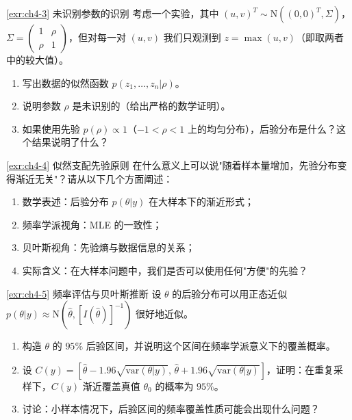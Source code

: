 \begin{Exercise}{\ref{exr:ch4-3}  未识别参数的识别}
考虑一个实验，其中 $(u, v)^T \sim \mathrm{N}((0,0)^T, \Sigma)$，$\Sigma = \begin{pmatrix} 1 & \rho \\ \rho & 1 \end{pmatrix}$，但对每一对 $(u,v)$ 我们只观测到 $z = \max(u,v)$（即取两者中的较大值）。
\begin{enumerate}
  \item 写出数据的似然函数 $p(z_1,\ldots,z_n|\rho)$。
  \item 说明参数 $\rho$ 是未识别的（给出严格的数学证明）。
  \item 如果使用先验 $p(\rho) \propto 1$（$-1<\rho<1$ 上的均匀分布），后验分布是什么？这个结果说明了什么？
\end{enumerate}
\end{Exercise}

\begin{Exercise}{\ref{exr:ch4-4}  似然支配先验原则}
在什么意义上可以说"随着样本量增加，先验分布变得渐近无关"？请从以下几个方面阐述：
\begin{enumerate}
  \item 数学表述：后验分布 $p(\theta|y)$ 在大样本下的渐近形式；
  \item 频率学派视角：MLE 的一致性；
  \item 贝叶斯视角：先验熵与数据信息的关系；
  \item 实际含义：在大样本问题中，我们是否可以使用任何"方便"的先验？
\end{enumerate}
\end{Exercise}

\begin{Exercise}{\ref{exr:ch4-5}  频率评估与贝叶斯推断}
设 $\theta$ 的后验分布可以用正态近似 $p(\theta|y) \approx \mathrm{N}(\hat{\theta}, [I(\hat{\theta})]^{-1})$ 很好地近似。
\begin{enumerate}
  \item 构造 $\theta$ 的 $95\%$ 后验区间，并说明这个区间在频率学派意义下的覆盖概率。
  \item 设 $C(y) = [\hat{\theta} - 1.96\sqrt{\text{var}(\theta|y)},\, \hat{\theta} + 1.96\sqrt{\text{var}(\theta|y)}]$，证明：在重复采样下，$C(y)$ 渐近覆盖真值 $\theta_0$ 的概率为 $95\%$。
  \item 讨论：小样本情况下，后验区间的频率覆盖性质可能会出现什么问题？
\end{enumerate}
\end{Exercise}


